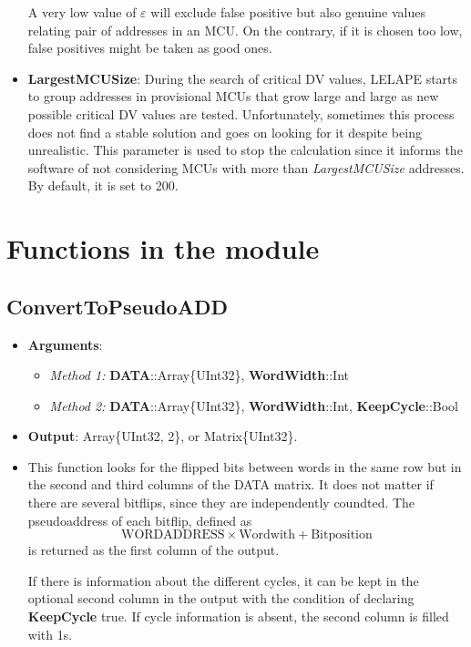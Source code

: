 \begin{itemize}
	A very low value of $\varepsilon$ will exclude false positive but also genuine values relating pair of addresses in an MCU. On the contrary, if it is chosen too low, false positives might be taken as good ones.
	\item \textbf{LargestMCUSize}: During the search of critical DV values, LELAPE starts to group addresses in provisional MCUs that grow large and large as new possible critical DV values are tested. Unfortunately, sometimes this process does not find a stable solution and goes on looking for it despite being unrealistic. This parameter is used to stop the calculation since it informs the software of not considering MCUs with more than \textit{LargestMCUSize} addresses. By default, it is set to 200.
\end{itemize}

 \section{Functions in the module}
 
 \subsection*{ConvertToPseudoADD}
 \begin{itemize}
 	\item \textbf{Arguments}: 
 		\begin{itemize}
 			\item \textit{Method 1: }\textbf{DATA}::Array\{UInt32\}, \textbf{WordWidth}::Int
 			\item \textit{Method 2: }\textbf{DATA}::Array\{UInt32\}, \textbf{WordWidth}::Int, \textbf{KeepCycle}::Bool
 		\end{itemize}
 	\item   \textbf{Output}: Array\{UInt32, 2\}, or Matrix\{UInt32\}.
 	\item  This function looks for the flipped bits between words in the same row but in the second
 	 and third columns of the DATA matrix. It does not matter if there are several bitflips, since they are independently coundted. 
 	 The pseudoaddress  of each bitflip, defined as \[\text{WORDADDRESS}\times\text{Wordwith}+\text{Bitposition}\] is returned as the first column of the output.
 	
 	 If there is information about the different cycles, it can be kept in the optional second column in the output with the condition of declaring \textbf{KeepCycle} true. If cycle information is absent, the second column is filled with 1s.
 	
 \end{itemize}

